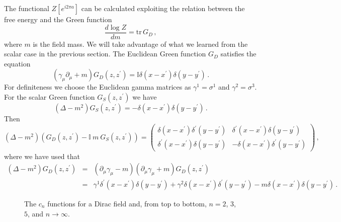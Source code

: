 \documentclass[a4paper]{article}
\begin{document}
The functional $Z[e^{i 2 \pi a}]$ can be calculated exploiting the relation between the free energy and the Green function  
\begin{equation}
\frac{d\log Z}{dm}=\textrm{tr} \, G_D\,,\label{pero}
\end{equation}
where $m$ is the field mass. 
 We will take advantage of what we learned from the scalar case in the previous section. The Euclidean Green function $G_D$ satisfies the equation
\begin{equation}
(\gamma_{\mu}\partial_{\mu}+m)G_D(z,z^{\prime})=\mathbb I \delta(x-x^{\prime})\delta(y-y^{\prime})\,. \label{deq}
\end{equation}
For definiteness we choose the Euclidean gamma matrices as $\gamma^1=\sigma^1$ and $\gamma^2=\sigma^3$.
For the scalar Green function $G_S(z,z^{\prime})$ we have
\begin{equation}
(\Delta-m^2)G_S(z,z^{\prime})=-\delta(x-x^{\prime})\delta(y-y^{\prime})\,.
\end{equation}
Then
\begin{equation}
(\Delta-m^2)(G_D(z,z^{\prime})-\mathbb I~m~G_S(z,z^{\prime}))=\begin{pmatrix}\delta(x-x^{\prime})\delta^{\prime}(y-y^{\prime})&\delta^{\prime}(x-x^{\prime})\delta(y-y^{\prime})\\\delta^{\prime}(x-x^{\prime})\delta(y-y^{\prime})&-\delta(x-x^{\prime})\delta^{\prime}(y-y^{\prime}) \end{pmatrix}\label{gsgd}\,,
\end{equation}
where we have used that
\begin{eqnarray}
(\Delta-m^2)G_D(z,z^{\prime})&=&(\partial_{\mu}\gamma_{\mu}-m)(\partial_{\mu}\gamma_{\mu}+m)G_D(z,z^{\prime})\nonumber\\&=&\gamma^1 \delta^{\prime}(x-x^{\prime})\delta(y-y^{\prime})+\gamma^2 \delta(x-x^{\prime})\delta^{\prime}(y-y^{\prime})-m\delta(x-x^{\prime})\delta(y-y^{\prime})\,.
\end{eqnarray}
 

\begin{figure} [tbp]
\centering
\leavevmode
\epsfxsize=8cm
\bigskip
{}
\caption{The $c_n$ functions for a Dirac field and, from top to bottom,  $n=2$, $3$, $5$, and $n\rightarrow \infty$.}
\label{fyfy}
\end{figure}
\end{document}
